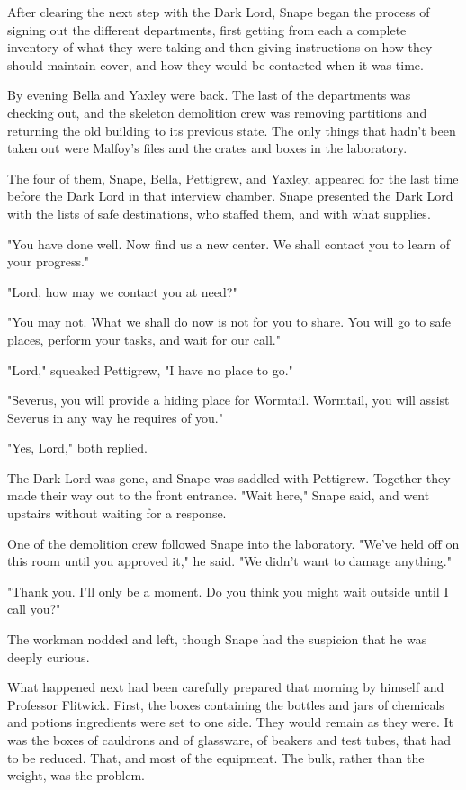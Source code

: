 \documentclass[a4paper,11pt]{article}
\begin{document}
After clearing the next step with the Dark Lord, Snape began the process of signing out the different departments, first getting from each a complete inventory of what they were taking and then giving instructions on how they should maintain cover, and how they would be contacted when it was time.

By evening Bella and Yaxley were back. The last of the departments was checking out, and the skeleton demolition crew was removing partitions and returning the old building to its previous state. The only things that hadn't been taken out were Malfoy's files and the crates and boxes in the laboratory.

The four of them, Snape, Bella, Pettigrew, and Yaxley, appeared for the last time before the Dark Lord in that interview chamber. Snape presented the Dark Lord with the lists of safe destinations, who staffed them, and with what supplies.

"You have done well. Now find us a new center. We shall contact you to learn of your progress."

"Lord, how may we contact you at need?"

"You may not. What we shall do now is not for you to share. You will go to safe places, perform your tasks, and wait for our call."

"Lord," squeaked Pettigrew, "I have no place to go."

"Severus, you will provide a hiding place for Wormtail. Wormtail, you will assist Severus in any way he requires of you."

"Yes, Lord," both replied.

The Dark Lord was gone, and Snape was saddled with Pettigrew. Together they made their way out to the front entrance. "Wait here," Snape said, and went upstairs without waiting for a response.

One of the demolition crew followed Snape into the laboratory. "We've held off on this room until you approved it," he said. "We didn't want to damage anything."

"Thank you. I'll only be a moment. Do you think you might wait outside until I call you?"

The workman nodded and left, though Snape had the suspicion that he was deeply curious.

What happened next had been carefully prepared that morning by himself and Professor Flitwick. First, the boxes containing the bottles and jars of chemicals and potions ingredients were set to one side. They would remain as they were. It was the boxes of cauldrons and of glassware, of beakers and test tubes, that had to be reduced. That, and most of the equipment. The bulk, rather than the weight, was the problem.
\end{document}
